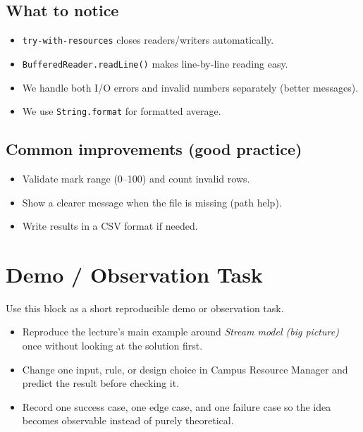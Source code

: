 \documentclass[11pt]{article}
\begin{document}
\subsection*{What to notice}
\begin{itemize}
  \item \texttt{try-with-resources} closes readers/writers automatically.
  \item \texttt{BufferedReader.readLine()} makes line-by-line reading easy.
  \item We handle both I/O errors and invalid numbers separately (better messages).
  \item We use \texttt{String.format} for formatted average.
\end{itemize}

\subsection*{Common improvements (good practice)}
\begin{itemize}
  \item Validate mark range (0--100) and count invalid rows.
  \item Show a clearer message when the file is missing (path help).
  \item Write results in a CSV format if needed.
\end{itemize}

\section{Demo / Observation Task}
Use this block as a short reproducible demo or observation task.
\begin{itemize}
  \item Reproduce the lecture's main example around \textit{Stream model (big picture)} once without looking at the solution first.
  \item Change one input, rule, or design choice in Campus Resource Manager and predict the result before checking it.
  \item Record one success case, one edge case, and one failure case so the idea becomes observable instead of purely theoretical.
\end{itemize}
\notesources{\OOPSUnitIIISources}
\end{document}
